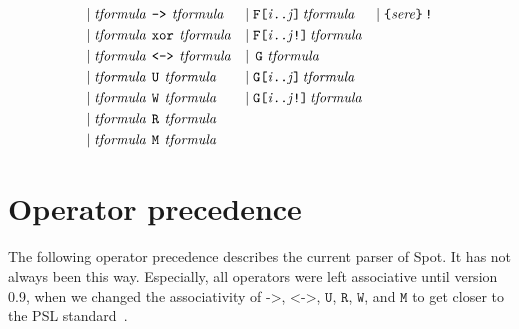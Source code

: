 \documentclass[a4paper,twoside,10pt,DIV=12]{scrreprt}
\newcommand{\FREP}[1]{\texttt{F[#1]}}
\newcommand{\StrongFREP}[1]{\texttt{F[#1!]}}
\DeclareMathOperator{\G}{\texttt{G}}
\newcommand{\GREP}[1]{\texttt{G[#1]}}
\newcommand{\StrongGREP}[1]{\texttt{G[#1!]}}
\newcommand{\U}{\mathbin{\texttt{U}}}
\newcommand{\R}{\mathbin{\texttt{R}}}
\newcommand{\M}{\mathbin{\texttt{M}}}
\newcommand{\W}{\mathbin{\texttt{W}}}
\DeclareMathOperator{\NOT}{\texttt{!}}
\newcommand{\XOR}{\mathbin{\texttt{xor}}}
\newcommand{\IMPLIES}{\mathbin{\texttt{->}}}
\newcommand{\EQUIV}{\mathbin{\texttt{<->}}}
\newcommand{\0}{\texttt{0}}
\newcommand{\1}{\texttt{1}}
\newcommand\mvar[1]{\ensuremath{\mathit{#1}}}
\newcommand\tsamp[1]{\text{\texttt{#1}}}
\newcommand\msamp[1]{#1}
\begin{document}
\begin{align*}
 \mid{}                     & \mathit{tformula}\,\msamp{\IMPLIES}\,\mathit{tformula} & \mid{} & \msamp{\FREP{\mvar{i}..\mvar{j}}}\,\mathit{tformula}       & \mid{} & \tsamp{\{}\mathit{sere}\tsamp{\}}\msamp{\NOT}                            \\
 \mid{}                     & \mathit{tformula}\,\msamp{\XOR}\,\mathit{tformula}     & \mid{} & \msamp{\StrongFREP{\mvar{i}..\mvar{j}}}\,\mathit{tformula}                                                                                     \\
 \mid{}                     & \mathit{tformula}\,\msamp{\EQUIV}\,\mathit{tformula}   & \mid{} & \msamp{\G}\,\mathit{tformula}                                                                                                                  \\
 \mid{}                     & \mathit{tformula}\,\msamp{\U}\,\mathit{tformula}       & \mid{} & \msamp{\GREP{\mvar{i}..\mvar{j}}}\,\mathit{tformula}                                                                                           \\
 \mid{}                     & \mathit{tformula}\,\msamp{\W}\,\mathit{tformula}       & \mid{} & \msamp{\StrongGREP{\mvar{i}..\mvar{j}}}\,\mathit{tformula}                                                                                     \\
 \mid{}                     & \mathit{tformula}\,\msamp{\R}\,\mathit{tformula}                                                                                                                                                                 \\
 \mid{}                     & \mathit{tformula}\,\msamp{\M}\,\mathit{tformula}
\end{align*}

\section{Operator precedence}

The following operator precedence describes the current parser of
Spot.  It has not always been this way.  Especially, all operators
were left associative until version 0.9, when we changed the
associativity of $\IMPLIES$, $\EQUIV$, $\U$, $\R$, $\W$, and $\M$ to get closer
to the PSL standard~\cite{psl.04.lrm,eisner.06.psl}.
\end{document}
